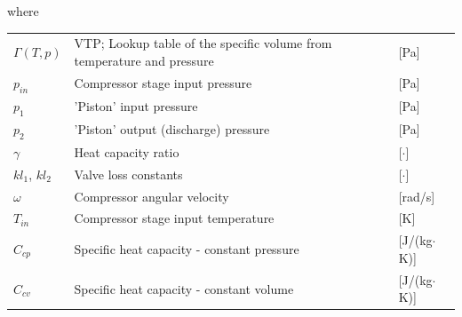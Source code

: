 where

\begin{center}
	\begin{tabular}{l p{8cm} l}
		$\Gamma(T,p)$   & VTP; Lookup table of the specific volume from temperature and pressure & [\si{Pa}]                         \\
		$p_{in}$        & Compressor stage input pressure                                        & [\si{Pa}]                         \\
		$p_1$           & 'Piston' input pressure                                                & [\si{Pa}]                         \\
		$p_2$           & 'Piston' output (discharge) pressure                                   & [\si{Pa}]                         \\
		$\gamma$        & Heat capacity ratio                                                    & [$ \cdot $]                       \\
		$ kl_1$, $kl_2$ & Valve loss constants                                                   & [$ \cdot $]                       \\
		$\omega$        & Compressor angular velocity                                            & [\si{rad}/\si{s}]                 \\
		$T_{in}$        & Compressor stage input temperature                                     & [\si{K}]                          \\
		$C_{cp}$        & Specific heat capacity - constant pressure                             & [\si{J}/(\si{kg}$ \cdot $\si{K})] \\
		$C_{cv} $       & Specific heat capacity - constant volume                               & [\si{J}/(\si{kg}$ \cdot $\si{K})]
	\end{tabular}
\end{center}



